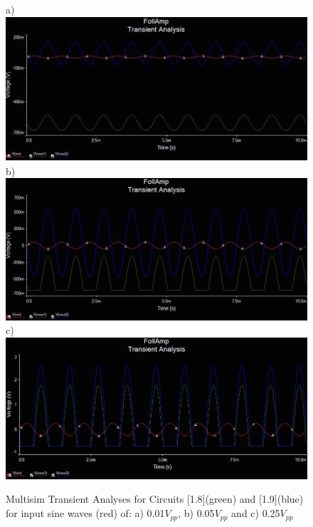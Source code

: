 \documentclass{article}
\begin{document}
\subsection{}
    \begin{figure}[H]
        \centering
        a)\includegraphics[scale = 0.35]{10a.jpeg}
        b)\includegraphics[scale = 0.35]{10b.jpeg}
        c)\includegraphics[scale = 0.35]{10c.jpeg}
        \caption{Multisim Transient Analyses for Circuits [1.8](green) and [1.9](blue) for input sine waves (red) of: a) 0.01$V_{pp}$, b) 0.05$V_{pp}$ and c) 0.25$V_{pp}$}
        \label{fig:my_label}
    \end{figure}
\end{document}
